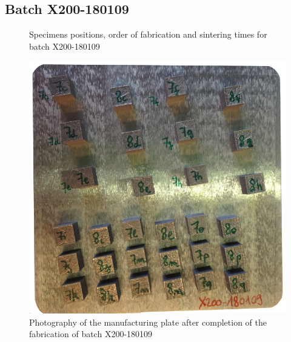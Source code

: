 \newpage
\subsection{Batch X200-180109}

\begin{figure}[ht]
\centering
\noindent{}
\decoRule
\caption[Specimens positions, order of fabrication and sintering times for batch X200-180109]{Specimens positions, order of fabrication and sintering times for batch X200-180109}
\label{fig:180109-cad}
\end{figure}

\begin{figure}[h!]
\centering
\includegraphics[scale=0.45]{Images/180109-real}
\decoRule
\caption[Photography of the manufacturing plate after completion of the fabrication of batch X200-180109]{Photography of the manufacturing plate after completion of the fabrication of batch X200-180109}
\label{fig:180109-real}
\end{figure}

